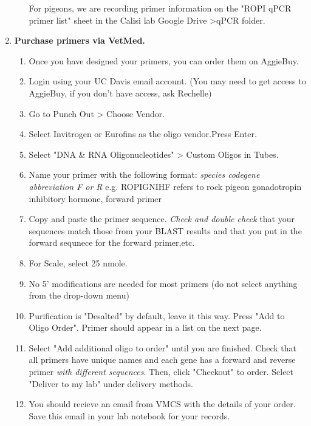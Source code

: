 \documentclass[a4paper,12pt,twoside]{book}
\begin{document}
\begin{enumerate}
\begin{enumerate}
	 For pigeons, we are recording primer information on the "ROPI qPCR primer list" sheet in the Calisi lab Google Drive \textgreater qPCR folder. 
\end{enumerate}
\pagebreak
\item {\bf Purchase primers via VetMed.}
\begin{enumerate}
	\item Once you have designed your primers, you can order them on AggieBuy.
	\item  Login using your UC Davis email account. (You may need to get access to AggieBuy, if you don't have access, ask Rechelle)
	\item  Go to Punch Out > Choose Vendor. 
	\item Select Invitrogen or Eurofins as the oligo vendor.Press Enter.  
	\item Select "DNA & RNA Oligonucleotides" > Custom Oligos in Tubes. 
	\item Name your primer with the following format: {\em species code\textunderscore gene abbreviation \textunderscore F or R}
	\subitem e.g. ROPI\textunderscore GNIH\textunderscore F  refers to rock pigeon gonadotropin inhibitory hormone, forward primer  
	\item Copy and paste the primer sequence. {\em Check and double check} that your sequences match those from your BLAST results and that you put in the forward sequnece for the forward primer,etc.  
	\item For Scale, select 25 nmole.  
	\item No 5' modifications are needed for most primers (do not select anything from the drop-down menu)  
	\item  Purification is "Desalted" by default, leave it this way. Press "Add to Oligo Order". Primer should appear in a list on the next page. 
	\item Select "Add additional oligo to order" until you are finished. Check that all primers have unique names and each gene has a forward and reverse primer {\em with different sequences}.
	\subitem Then, click "Checkout" to order. Select "Deliver to my lab" under delivery methods.  
	\item You should recieve an email from VMCS with the details of your order. Save this email in your lab notebook for your records.  	
\end{enumerate}

\end{enumerate}
\end{document}

